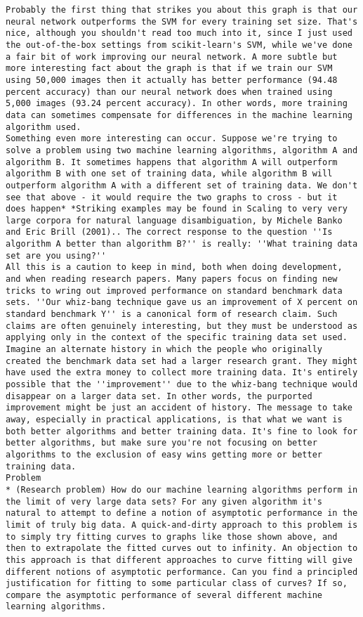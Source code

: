 \begin{lstlisting}
Probably the first thing that strikes you about this graph is that our neural network outperforms the SVM for every training set size. That's nice, although you shouldn't read too much into it, since I just used the out-of-the-box settings from scikit-learn's SVM, while we've done a fair bit of work improving our neural network. A more subtle but more interesting fact about the graph is that if we train our SVM using 50,000 images then it actually has better performance (94.48 percent accuracy) than our neural network does when trained using 5,000 images (93.24 percent accuracy). In other words, more training data can sometimes compensate for differences in the machine learning algorithm used.
Something even more interesting can occur. Suppose we're trying to solve a problem using two machine learning algorithms, algorithm A and algorithm B. It sometimes happens that algorithm A will outperform algorithm B with one set of training data, while algorithm B will outperform algorithm A with a different set of training data. We don't see that above - it would require the two graphs to cross - but it does happen* *Striking examples may be found in Scaling to very very large corpora for natural language disambiguation, by Michele Banko and Eric Brill (2001).. The correct response to the question ''Is algorithm A better than algorithm B?'' is really: ''What training data set are you using?''
All this is a caution to keep in mind, both when doing development, and when reading research papers. Many papers focus on finding new tricks to wring out improved performance on standard benchmark data sets. ''Our whiz-bang technique gave us an improvement of X percent on standard benchmark Y'' is a canonical form of research claim. Such claims are often genuinely interesting, but they must be understood as applying only in the context of the specific training data set used. Imagine an alternate history in which the people who originally created the benchmark data set had a larger research grant. They might have used the extra money to collect more training data. It's entirely possible that the ''improvement'' due to the whiz-bang technique would disappear on a larger data set. In other words, the purported improvement might be just an accident of history. The message to take away, especially in practical applications, is that what we want is both better algorithms and better training data. It's fine to look for better algorithms, but make sure you're not focusing on better algorithms to the exclusion of easy wins getting more or better training data.
Problem
* (Research problem) How do our machine learning algorithms perform in the limit of very large data sets? For any given algorithm it's natural to attempt to define a notion of asymptotic performance in the limit of truly big data. A quick-and-dirty approach to this problem is to simply try fitting curves to graphs like those shown above, and then to extrapolate the fitted curves out to infinity. An objection to this approach is that different approaches to curve fitting will give different notions of asymptotic performance. Can you find a principled justification for fitting to some particular class of curves? If so, compare the asymptotic performance of several different machine learning algorithms. 

\end{lstlisting}
